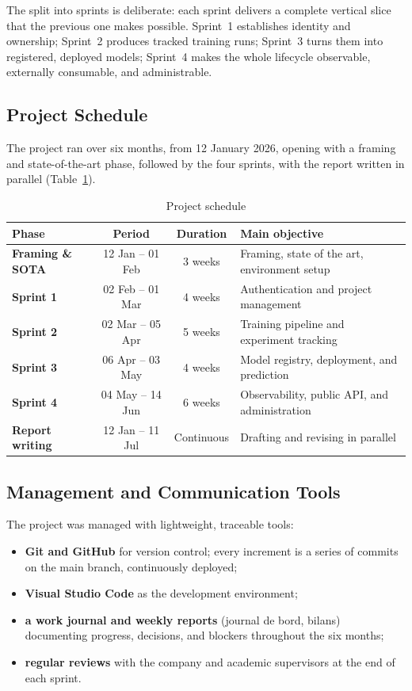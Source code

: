 The split into sprints is deliberate: each sprint delivers a complete vertical
slice that the previous one makes possible. Sprint~1 establishes identity and
ownership; Sprint~2 produces tracked training runs; Sprint~3 turns them into
registered, deployed models; Sprint~4 makes the whole lifecycle observable,
externally consumable, and administrable.

\subsection{Project Schedule}
The project ran over six months, from 12 January 2026, opening with a framing
and state-of-the-art phase, followed by the four sprints, with the report
written in parallel (Table~\ref{tab:schedule}).

\begin{table}[H]\centering
\renewcommand{\arraystretch}{1.2}
\caption{Project schedule}\label{tab:schedule}
\small
\begin{tabularx}{\textwidth}{|>{\bfseries}l|c|c|X|}
\hline
\rowcolor{primary!15}
\textbf{Phase} & \textbf{Period} & \textbf{Duration} & \textbf{Main objective}\\
\hline
Framing \& SOTA & 12 Jan -- 01 Feb & 3 weeks & Framing, state of the art, environment setup\\ \hline
Sprint 1 & 02 Feb -- 01 Mar & 4 weeks & Authentication and project management\\ \hline
Sprint 2 & 02 Mar -- 05 Apr & 5 weeks & Training pipeline and experiment tracking\\ \hline
Sprint 3 & 06 Apr -- 03 May & 4 weeks & Model registry, deployment, and prediction\\ \hline
Sprint 4 & 04 May -- 14 Jun & 6 weeks & Observability, public API, and administration\\ \hline
Report writing & 12 Jan -- 11 Jul & Continuous & Drafting and revising in parallel\\ \hline
\end{tabularx}
\end{table}

\subsection{Management and Communication Tools}
The project was managed with lightweight, traceable tools:
\begin{itemize}[leftmargin=1.4em]
  \item \textbf{Git and GitHub} for version control; every increment is a
        series of commits on the main branch, continuously deployed;
  \item \textbf{Visual Studio Code} as the development environment;
  \item \textbf{a work journal and weekly reports} (journal de bord, bilans)
        documenting progress, decisions, and blockers throughout the six
        months;
  \item \textbf{regular reviews} with the company and academic supervisors at
        the end of each sprint.
\end{itemize}

